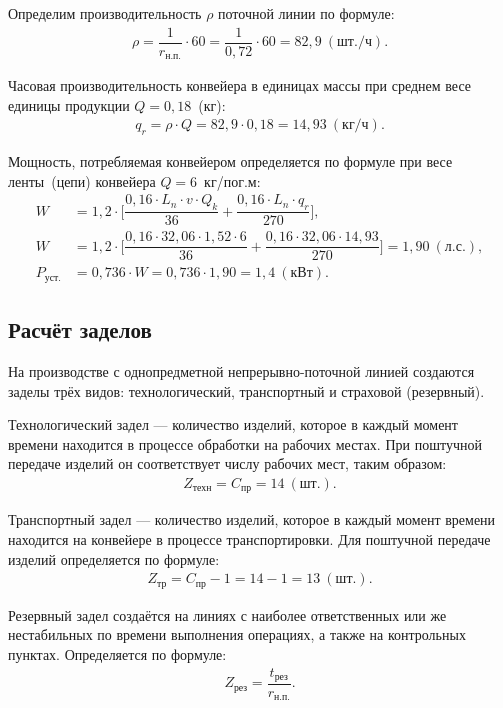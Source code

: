 Определим производительность $\rho$ поточной линии по формуле:
\begin{align*}
  \rho = \dfrac{1}{r_{\text{н.п.}}} \cdot 60 = \dfrac{1}{0{,}72} \cdot 60 = 82{,}9~(\text{шт./ч}).
\end{align*}

Часовая производительность конвейера в единицах массы при среднем весе
единицы продукции $Q = 0{,}18 $~(кг):
\begin{align*}
  q_r = \rho \cdot Q = 82{,}9 \cdot 0{,}18 = 14{,}93~(\text{кг/ч}).
\end{align*}

Мощность, потребляемая конвейером определяется по формуле при весе ленты~(цепи)
конвейера $Q = 6$~кг/пог.м:
\begin{align*}
  W &= 1{,}2 \cdot \Big[ \dfrac{ 0{,}16 \cdot L_n \cdot v \cdot Q_k }{ 36 } + \dfrac{ 0{,}16 \cdot L_n \cdot q_r }{ 270 } \Big] , \\
  W &= 1{,}2 \cdot \Big[ \dfrac{ 0{,}16 \cdot 32{,}06 \cdot 1{,}52 \cdot 6 }{ 36 } + \dfrac{ 0{,}16 \cdot 32{,}06 \cdot 14{,}93 }{ 270 } \Big] = 1{,}90~(\text{л.с.}), \\
  P_{\text{уст.}} &= 0{,}736 \cdot W = 0{,}736 \cdot 1{,}90 = 1{,}4~(\text{кВт}).
\end{align*}


\subsection{Расчёт заделов}

На производстве с однопредметной непрерывно-поточной линией создаются заделы
трёх видов: технологический, транспортный и страховой (резервный).

Технологический задел --- количество изделий, которое в каждый момент времени
находится в процессе обработки на рабочих местах. При поштучной передаче изделий
он соответствует числу рабочих мест, таким образом:
\begin{align*}
  Z_{\text{техн}} = C_{\text{пр}} = 14~(\text{шт.}).
\end{align*}

Транспортный задел --- количество изделий, которое в каждый момент времени
находится на конвейере в процессе транспортировки. Для поштучной передаче
изделий определяется по формуле:
\begin{align*}
  Z_{\text{тр}} = C_{\text{пр}} - 1 = 14 - 1 = 13~(\text{шт.}).
\end{align*}

Резервный задел создаётся на линиях с наиболее ответственных или же нестабильных
по времени выполнения операциях, а также на контрольных пунктах. Определяется
по формуле:
\begin{align*}
  Z_{\text{рез}} = \dfrac{t_{\text{рез}}}{r_{\text{н.п.}}}.
\end{align*}

